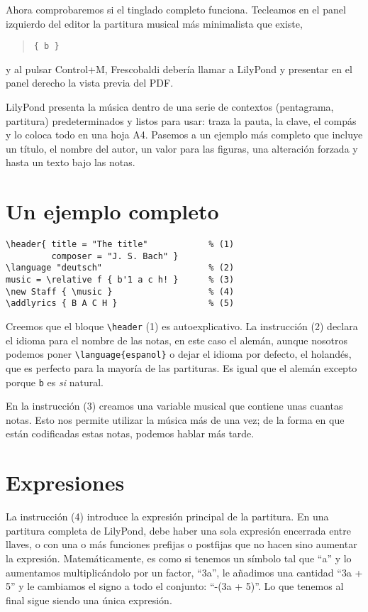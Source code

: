 \documentclass[a4paper,10pt,oneside,headinclude,titlepage]{article} %
\begin{document}
Ahora comprobaremos si el tinglado completo funciona. Tecleamos en el
panel izquierdo del editor la partitura musical más minimalista que
existe,

\begin{quote}
\verb+{ b }+
\end{quote}

y al pulsar Control+M, Frescobaldi debería llamar a LilyPond y
presentar en el panel derecho la vista previa del PDF.

LilyPond presenta la música dentro de una serie de contextos
(pentagrama, partitura) predeterminados y listos para usar: traza la
pauta, la clave, el compás y lo coloca todo en una hoja A4.  Pasemos a
un ejemplo más completo que incluye un título, el nombre del autor, un
valor para las figuras, una alteración forzada y hasta un texto bajo
las notas.

\section{Un ejemplo completo}

\begin{verbatim}
\header{ title = "The title"            % (1)
         composer = "J. S. Bach" }
\language "deutsch"                     % (2)
music = \relative f { b'1 a c h! }      % (3)
\new Staff { \music }                   % (4)
\addlyrics { B A C H }                  % (5)
\end{verbatim}

Creemos que el bloque \verb+\header+ (1) es autoexplicativo. La
instrucción (2) declara el idioma para el nombre de las notas, en este
caso el alemán, aunque nosotros podemos poner
\verb+\language{espanol}+ o dejar el idioma por defecto, el holandés,
que es perfecto para la mayoría de las partituras. Es igual que el
alemán excepto porque \verb+b+ es \emph{si} natural.

En la instrucción (3) creamos una variable musical que contiene unas
cuantas notas. Esto nos permite utilizar la música más de una vez; de
la forma en que están codificadas estas notas, podemos hablar más
tarde.


\section{Expresiones}

La instrucción (4) introduce la expresión principal de la
partitura. En una partitura completa de LilyPond, debe haber una sola
expresión encerrada entre llaves, o con una o más funciones prefijas o
postfijas que no hacen sino aumentar la expresión.  Matemáticamente,
es como si tenemos un símbolo tal que ``a'' y lo aumentamos
multiplicándolo por un factor, ``3a'', le añadimos una cantidad ``3a +
5'' y le cambiamos el signo a todo el conjunto: ``-(3a + 5)''. Lo que
tenemos al final sigue siendo una única expresión.
\end{document}

